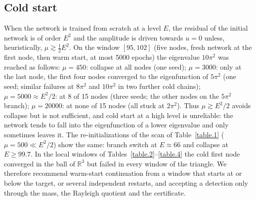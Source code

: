 \documentclass[10pt]{amsart}
\theoremstyle{definition}
\theoremstyle{remark}
\theoremstyle{plain}
\newcommand{\R}{\mathbb{R}}
\begin{document}
\subsection{Cold start}\label{app.cold}
When the network is trained from scratch at a level $E$, the residual of the initial network is of order
$E^2$ and the amplitude is driven towards $u=0$ unless, heuristically, $\mu\gtrsim\frac12E^2$. On the
window $[95,102]$ (five nodes, fresh network at the first node, then warm start, at most 5000 epochs)
the eigenvalue $10\pi^2$ was reached as follows: $\mu=450$: collapse at all nodes (one seed); $\mu=3000$:
only at the last node, the first four nodes converged to the eigenfunction of $5\pi^2$ (one seed; similar
failures at $8\pi^2$ and $10\pi^2$ in two further cold chains); $\mu=5000\approx E^2/2$: at 8 of 15 nodes
(three seeds; the other nodes on the $5\pi^2$ branch); $\mu=20000$: at none of 15 nodes (all stuck at
$2\pi^2$). Thus $\mu\gtrsim E^2/2$ avoids collapse but is not sufficient, and cold start at a high level is
unreliable: the network tends to fall into the eigenfunction of a lower eigenvalue and only sometimes
leaves it. The re-initializations of the scan of Table~\ref{table.1} ($\mu=500\ll E^2/2$) show the same:
branch switch at $E\approx66$ and collapse at $E\ge99.7$. In the local windows of
Tables~\ref{table.2}--\ref{table.4} the cold first node converged in the ball of $\R^3$ but failed in every
window of the triangle. We therefore recommend warm-start continuation from a window that starts at or
below the target, or several independent restarts, and accepting a detection only through the mass,
the Rayleigh quotient and the certificate.
\end{document}
